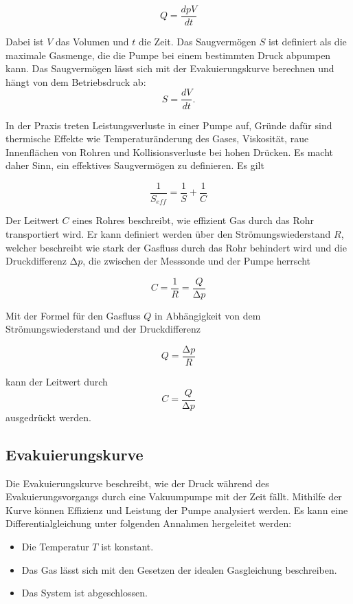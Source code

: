 \begin{equation}
    Q=\frac{dpV}{dt}
    \label{eq:saugleistung}
\end{equation}

Dabei ist \( V \) das Volumen und \( t \) die Zeit.
Das Saugvermögen $S$ ist definiert als die maximale Gasmenge, die die Pumpe bei einem bestimmten Druck abpumpen kann. Das Saugvermögen lässt sich 
mit der Evakuierungskurve berechnen und hängt von dem Betriebsdruck ab:
\begin{equation}
    S=\frac{dV}{dt}.
    \label{eq:saugvermögen}
\end{equation} 

In der Praxis treten Leistungsverluste in einer Pumpe auf, Gründe dafür sind thermische Effekte wie Temperaturänderung des Gases,
Viskosität, raue Innenflächen von Rohren und Kollisionsverluste bei hohen Drücken. Es macht daher Sinn, ein effektives Saugvermögen zu definieren.
Es gilt \cite{grundlagen_vakuumtechnik}

\begin{equation}
    \frac{1}{S_{eff}}=\frac{1}{S}+\frac{1}{C}
    \label{eq:effektives_saugvermögen}
\end{equation}   

Der Leitwert \( C \) eines Rohres beschreibt, wie effizient Gas durch das Rohr transportiert wird. Er kann definiert werden über 
den Strömungswiederstand \( R \), welcher beschreibt wie stark der Gasfluss durch das Rohr behindert wird 
und die Druckdifferenz \(\increment p\), die zwischen der Messsonde und der Pumpe herrscht

\begin{equation}
    C=\frac{1}{R}=\frac{Q}{\increment p}
    \label{eq:leitwert1}
\end{equation}

Mit der Formel für den Gasfluss \( Q \) in Abhängigkeit von dem Strömungswiederstand und der Druckdifferenz

\begin{equation}
    Q=\frac{\increment p}{R}
    \label{eq:strömungswiderstand1}
\end{equation}

kann der Leitwert durch
\begin{equation}
    C=\frac{Q}{\increment p}
    \label{eq:leitwert2}
\end{equation} 
ausgedrückt werden.

\subsection{Evakuierungskurve}
Die Evakuierungskurve beschreibt, wie der Druck während des Evakuierungsvorgangs durch eine Vakuumpumpe 
mit der Zeit fällt. Mithilfe der Kurve können Effizienz und Leistung der Pumpe analysiert werden.
Es kann eine Differentialgleichung unter folgenden Annahmen hergeleitet werden:
\begin{itemize}
\item Die Temperatur \(T \) ist konstant. 
\item Das Gas lässt sich mit den Gesetzen der idealen Gasgleichung beschreiben.
\item Das System ist abgeschlossen.
\end{itemize}

